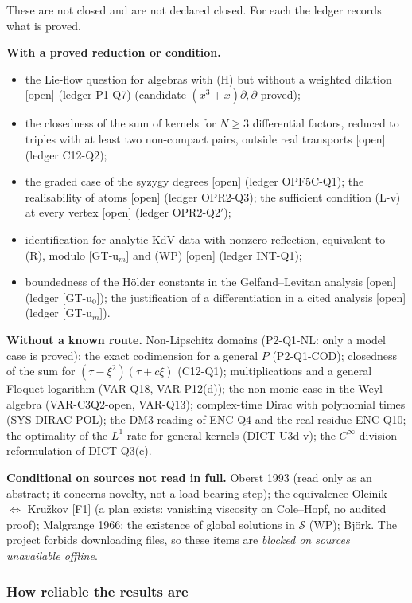 \documentclass[11pt]{article}
\theoremstyle{plain}
\theoremstyle{definition}
\theoremstyle{remark}
\newcommand{\badge}[2]{\textcolor{#1}{\textsf{\footnotesize[#2]}}}
\newcommand{\openq}{\badge{cB}{open}}
\newcommand{\led}[1]{\textcolor{cG}{\textsf{\footnotesize(ledger #1)}}}
\begin{document}
These are not closed and are not declared closed. For each the ledger records what is proved.

\textbf{With a proved reduction or condition.}
\begin{itemize}
\item the Lie-flow question for algebras with (H) but without a weighted dilation \openq{} \led{P1-Q7} (candidate $(x^3+x)\partial,\partial$ proved);
\item the closedness of the sum of kernels for $N\ge3$ differential factors, reduced to triples with at least two non-compact pairs, outside real transports \openq{} \led{C12-Q2};
\item the graded case of the syzygy degrees \openq{} \led{OPF5C-Q1}; the realisability of atoms \openq{} \led{OPR2-Q3}; the sufficient condition (L-v) at every vertex \openq{} \led{OPR2-Q2$'$};
\item identification for analytic KdV data with nonzero reflection, equivalent to (R), modulo [GT-u$_m$] and (WP) \openq{} \led{INT-Q1};
\item boundedness of the H\"older constants in the Gelfand--Levitan analysis \openq{} \led{[GT-u$_0$]}; the justification of a differentiation in a cited analysis \openq{} \led{[GT-u$_m$]}.
\end{itemize}

\textbf{Without a known route.} Non-Lipschitz domains (P2-Q1-NL: only a model case is proved); the exact codimension for a general $P$ (P2-Q1-COD); closedness of the sum for $(\tau-\xi^2)(\tau+c\xi)$ (C12-Q1); multiplications and a general Floquet logarithm (VAR-Q18, VAR-P12(d)); the non-monic case in the Weyl algebra (VAR-C3Q2-open, VAR-Q13); complex-time Dirac with polynomial times (SYS-DIRAC-POL); the DM3 reading of ENC-Q4 and the real residue ENC-Q10; the optimality of the $L^1$ rate for general kernels (DICT-U3d-v); the $C^\infty$ division reformulation of DICT-Q3(c).

\textbf{Conditional on sources not read in full.} Oberst 1993 (read only as an abstract; it concerns novelty, not a load-bearing step); the equivalence Oleinik $\Leftrightarrow$ Kru\v zkov [F1] (a plan exists: vanishing viscosity on Cole--Hopf, no audited proof); Malgrange 1966; the existence of global solutions in $\mathcal S$ (WP); Bj\"ork. The project forbids downloading files, so these items are \emph{blocked on sources unavailable offline}.

\subsubsection{How reliable the results are}
\end{document}
